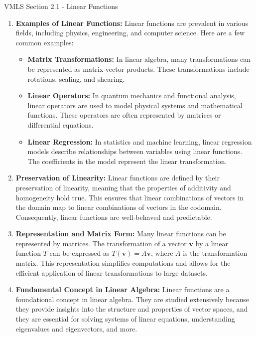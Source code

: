 \begin{notes}{VMLS Section 2.1 - Linear Functions}
\begin{enumerate}
        \item \textbf{Examples of Linear Functions:} Linear functions are prevalent in various fields, including physics, engineering, and computer science. Here are a few common examples:
        \begin{itemize}
            \item \textbf{Matrix Transformations:} In linear algebra, many transformations can be represented as matrix-vector products. These transformations include rotations, scaling, and shearing.
            \item \textbf{Linear Operators:} In quantum mechanics and functional analysis, linear operators are used to model physical systems and mathematical functions. These operators are often represented 
            by matrices or differential equations.
            \item \textbf{Linear Regression:} In statistics and machine learning, linear regression models describe relationships between variables using linear functions. The coefficients in the model represent 
            the linear transformation.
        \end{itemize}
        
        \item \textbf{Preservation of Linearity:} Linear functions are defined by their preservation of linearity, meaning that the properties of additivity and homogeneity hold true. This ensures that linear 
        combinations of vectors in the domain map to linear combinations of vectors in the codomain. Consequently, linear functions are well-behaved and predictable.
        
        \item \textbf{Representation and Matrix Form:} Many linear functions can be represented by matrices. The transformation of a vector \(\mathbf{v}\) by a linear function \(T\) can be expressed as \(T(\mathbf{v}) 
        = A\mathbf{v}\), where \(A\) is the transformation matrix. This representation simplifies computations and allows for the efficient application of linear transformations to large datasets.
        
        \item \textbf{Fundamental Concept in Linear Algebra:} Linear functions are a foundational concept in linear algebra. They are studied extensively because they provide insights into the structure and 
        properties of vector spaces, and they are essential for solving systems of linear equations, understanding eigenvalues and eigenvectors, and more.
    \end{enumerate}
    

\end{notes}

